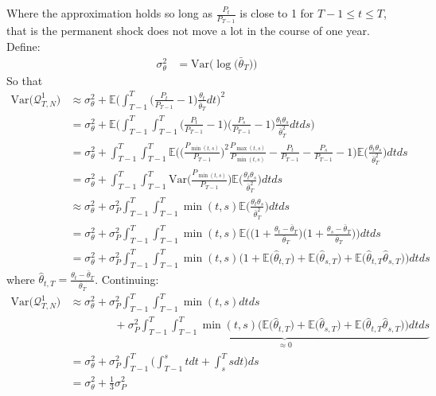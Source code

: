 Where the approximation holds so long as $\frac{P_{t}}{P_{T-1}}$ is close to 1 for $T-1 \leq t \leq T$, that is the permanent shock does not move a lot in the course of one year. Define:
\begin{align*}
\sigma^2_{\theta}&= \mathrm{Var}\Bigg(\log \Big(\bar{\theta}_T \Big) \Bigg)
\end{align*}
So that
\begin{align*}
\mathrm{Var}\big(\mathcal{Q}^1_{T,N}\big) &\approx \sigma^2_{\theta} + \mathbb{E} \Bigg(\int_{T-1}^{T} \Big(\frac{P_t}{P_{T-1}}-1\Big)\frac{\theta_t}{\bar{\theta}_T} dt \Bigg)^2 \\
&= \sigma^2_{\theta} + \mathbb{E} \Bigg(\int_{T-1}^{T} \int_{T-1}^{T} \Big(\frac{P_t}{P_{T-1}}-1\Big) \Big(\frac{P_s}{P_{T-1}}-1\Big) \frac{\theta_t \theta_s}{\bar{\theta}_T^2}  dt ds \Bigg) \\
&= \sigma^2_{\theta} +  \int_{T-1}^{T} \int_{T-1}^{T} \mathbb{E}\Bigg(\Big(\frac{P_{\min(t,s)}}{P_{T-1}}\Big)^2 \frac{P_{\max(t,s)}}{P_{\min(t,s)}}-\frac{P_t}{P_{T-1}}-\frac{P_s}{P_{T-1}}-1\Bigg) \mathbb{E} \Bigg( \frac{\theta_t \theta_s}{\bar{\theta}_T^2} \Bigg)  dt ds \\
&= \sigma^2_{\theta} +    \int_{T-1}^{T} \int_{T-1}^{T} \mathrm{Var}\Bigg(\frac{P_{\min(t,s)}}{P_{T-1}} \Bigg) \mathbb{E}\Bigg( \frac{\theta_t \theta_s}{\bar{\theta}_T^2} \Bigg) dt ds \\
&\approx \sigma^2_{\theta} +  \sigma^2_P\int_{T-1}^{T} \int_{T-1}^{T}  \min(t,s)  \mathbb{E} \Bigg( \frac{\theta_t \theta_s}{\bar{\theta}_T^2} \Bigg) dt ds \\
&= \sigma^2_{\theta} +  \sigma^2_P\int_{T-1}^{T} \int_{T-1}^{T}  \min(t,s)  \mathbb{E} \Bigg(\Big( 1 +\frac{\theta_t-\bar{\theta}_T}{\bar{\theta}_T} \Big) \Big( 1 +\frac{\theta_s-\bar{\theta}_T}{\bar{\theta}_T} \Big)\Bigg) dt ds \\
&= \sigma^2_{\theta} +  \sigma^2_P\int_{T-1}^{T} \int_{T-1}^{T}  \min(t,s)   \Bigg(1+\mathbb{E}\Big( \hat{\theta}_{t,T} \Big) +\mathbb{E} \Big( \hat{\theta}_{s,T} \Big) +\mathbb{E}\Big( \hat{\theta}_{t,T} \hat{\theta}_{s,T}\Big)\Bigg) dt ds
\end{align*}
where $\hat{\theta}_{t,T} = \frac{\theta_t-\bar{\theta}_T}{\bar{\theta}_T}$. Continuing:
\begin{align*}
\mathrm{Var}\big(\mathcal{Q}^1_{T,N}\big) 
&\approx \sigma^2_{\theta} +  \sigma^2_P\int_{T-1}^{T} \int_{T-1}^{T}  \min(t,s)    dt ds \\
& \qquad \qquad +\sigma^2_P \underbrace{\int_{T-1}^{T} \int_{T-1}^{T}  \min(t,s)   \Bigg(\mathbb{E}\Big( \hat{\theta}_{t,T} \Big) +\mathbb{E} \Big( \hat{\theta}_{s,T} \Big) +\mathbb{E}\Big( \hat{\theta}_{t,T} \hat{\theta}_{s,T}\Big)\Bigg) dt ds }_{\approx 0} \\
&= \sigma^2_{\theta} +  \sigma^2_P\int_{T-1}^{T} \Bigg( \int_{T-1}^{s}  t dt +  \int_{s}^{T}  s dt\Bigg) ds \\
&= \sigma^2_{\theta} +  \frac{1}{3}\sigma^2_P
\end{align*}
